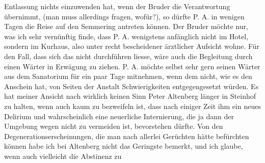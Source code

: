 \begin{ledgroupsized}[t]{13cm}
               Entlassung nichts einzuwenden hat, wenn der Bruder die Verantwortung übernimmt, (man muss allerdings
               fragen, wofür?), so dürfte P. A. in wenigen Tagen
               die Reise auf den Semmering antreten können. Der Bruder möchte nur, was ich sehr
               vernünftig finde, dass P. A. wenigstens anfänglich
               nicht im Hotel, sondern im Kurhaus, also unter recht
               bescheidener ärztlicher Aufsicht wohne. Für den Fall, dass sich das nicht durchführen
               liesse, wäre auch die Begleitung durch einen Wärter in Erwägung zu ziehen. P. A. möchte selbst sehr gern seinen Wärter aus dem Sanatorium für
               ein paar Tage mitnehmen, wenn dem nicht, wie es den Anschein hat, von Seiten der
               Anstalt Schwierigkei{\pb}ten entgegengesetzt würden. Es hat meiner Ansicht nach wirklich keinen Sinn Peter Altenberg länger in Steinhof zu halten, wenn auch kaum zu bezweifeln ist, dass nach
               einiger Zeit ihm ein neues Delirium und wahrscheinlich eine neuerliche Internierung,
               die ja dann der Umgebung wegen nicht zu vermeiden ist, bevorstehen dürfte. Von den
               Degenerationserscheinungen, die man nach allerlei Gerüchten hätte befürchten können
               habe ich bei Altenberg nicht das Geringste
               bemerkt, und ich glaube, wenn auch vielleicht die \label{T_L02129_1v}\label{T_L02129_1h} Abstinenz zu

\end{ledgroupsized}
